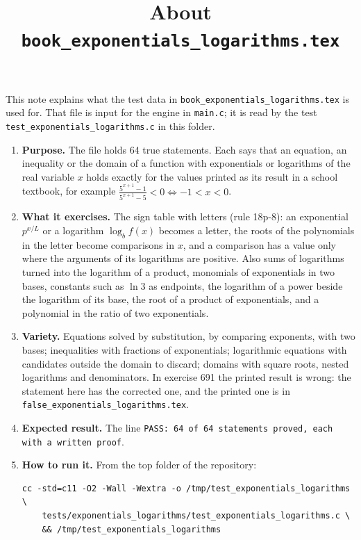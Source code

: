\documentclass[11pt,a4paper]{article}
\title{About \texttt{book\_exponentials\_logarithms.tex}}
\author{}
\date{}
\begin{document}
\maketitle
This note explains what the test data in \texttt{book\_exponentials\_logarithms.tex} is used for. That file is input for the engine in \texttt{main.c}; it is read by the test \texttt{test\_exponentials\_logarithms.c} in this folder.

\begin{enumerate}
\item \textbf{Purpose.} The file holds 64 true statements. Each says that an equation, an inequality or the domain of a function with exponentials or logarithms of the real variable $x$ holds exactly for the values printed as its result in a school textbook, for example $\frac{5^{x+1} - 1}{5^{x+1} - 5} < 0 \iff -1 < x < 0$.

\item \textbf{What it exercises.} The sign table with letters (rule 18p-8): an exponential $p^{x/L}$ or a logarithm $\log_b f(x)$ becomes a letter, the roots of the polynomials in the letter become comparisons in $x$, and a comparison has a value only where the arguments of its logarithms are positive. Also sums of logarithms turned into the logarithm of a product, monomials of exponentials in two bases, constants such as $\ln 3$ as endpoints, the logarithm of a power beside the logarithm of its base, the root of a product of exponentials, and a polynomial in the ratio of two exponentials.

\item \textbf{Variety.} Equations solved by substitution, by comparing exponents, with two bases; inequalities with fractions of exponentials; logarithmic equations with candidates outside the domain to discard; domains with square roots, nested logarithms and denominators. In exercise 691 the printed result is wrong: the statement here has the corrected one, and the printed one is in \texttt{false\_exponentials\_logarithms.tex}.

\item \textbf{Expected result.} The line \texttt{PASS: 64 of 64 statements proved, each with a written proof}.

\item \textbf{How to run it.} From the top folder of the repository:
\begin{verbatim}
cc -std=c11 -O2 -Wall -Wextra -o /tmp/test_exponentials_logarithms \
    tests/exponentials_logarithms/test_exponentials_logarithms.c \
    && /tmp/test_exponentials_logarithms
\end{verbatim}
\end{enumerate}
\end{document}
